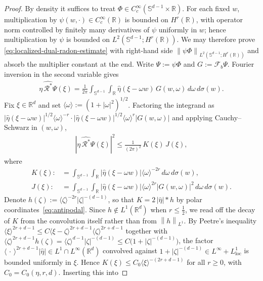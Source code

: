 \documentclass[10pt,a4paper]{amsart}
\newcommand{\R}{\mathbb{R}}
\newcommand{\Sph}{\mathbb S}
\newcommand{\norm}[1]{\left\|#1\right\|}
\begin{document}
\begin{proof}
By density it suffices to treat $\Phi\in C_c^\infty(\Sph^{d-1}\times\R)$. For each
fixed $w$, multiplication by $\psi(w,\cdot)\in C_c^\infty(\R)$ is bounded on
$H^r(\R)$, with operator norm controlled by finitely many derivatives of $\psi$
uniformly in $w$; hence multiplication by $\psi$ is bounded on
$L^2(\Sph^{d-1};H^r(\R))$. We may therefore prove
\eqref{eq:localized-dual-radon-estimate} with right-hand side
$\norm{\psi\Phi}_{L^2(\Sph^{d-1};H^r(\R))}$ and absorb the multiplier constant at
the end. Write $\Psi:=\psi\Phi$ and $G:=\mathcal F_b\Psi$. Fourier inversion in the
second variable gives
\begin{align*}
    \widehat{\eta\,\mathcal R^*\Psi}(\xi)
    =\frac1{2\pi}\int_{\Sph^{d-1}}\int_\R
    \widehat\eta(\xi-\omega w)\,G(w,\omega)\,d\omega\,d\sigma(w).
\end{align*}
Fix $\xi\in\R^d$ and set $\langle\omega\rangle:=(1+|\omega|^2)^{1/2}$. Factoring the
integrand as
$|\widehat\eta(\xi-\omega w)|^{1/2}\langle\omega\rangle^{-r}
\cdot|\widehat\eta(\xi-\omega w)|^{1/2}\langle\omega\rangle^{r}|G(w,\omega)|$
and applying Cauchy--Schwarz in $(w,\omega)$,
\begin{align}
    |\widehat{\eta\,\mathcal R^*\Psi}(\xi)|^2
    \le\frac1{(2\pi)^2}\,K(\xi)\,J(\xi),
    \label{eq:CS-split}
\end{align}
where
\begin{align*}
    K(\xi):&=\int_{\Sph^{d-1}}\int_\R|\widehat\eta(\xi-\omega w)|
\langle\omega\rangle^{-2r}\,d\omega\,d\sigma(w), \\
    J(\xi):&=\int_{\Sph^{d-1}}\int_\R|\widehat\eta(\xi-\omega w)|
\langle\omega\rangle^{2r}|G(w,\omega)|^2\,d\omega\,d\sigma(w).
\end{align*}
Denote $h(\zeta):=\langle\zeta\rangle^{-2r}|\zeta|^{-(d-1)}$, so that
$K=2\,|\widehat\eta|*h$ by polar coordinates~\eqref{eq:antipodal}. Since
$h\notin L^1(\R^d)$ when $r\le\tfrac12$, we read off the decay of $K$ from the
convolution itself rather than from $\norm{h}_{L^1}$. By Peetre's inequality
$\langle\xi\rangle^{2r+d-1}\le C\langle\xi-\zeta\rangle^{2r+d-1}
\langle\zeta\rangle^{2r+d-1}$ together with
$\langle\zeta\rangle^{2r+d-1}h(\zeta)=\langle\zeta\rangle^{d-1}|\zeta|^{-(d-1)}
\le C\bigl(1+|\zeta|^{-(d-1)}\bigr)$, the factor
$\langle\,\cdot\,\rangle^{2r+d-1}|\widehat\eta|\in L^1\cap L^\infty(\R^d)$
convolved against $1+|\zeta|^{-(d-1)}\in L^\infty+L^1_{\mathrm{loc}}$ is bounded
uniformly in $\xi$. Hence $K(\xi)\le C_0\langle\xi\rangle^{-(2r+d-1)}$ for all
$r\ge0$, with $C_0=C_0(\eta,r,d)$. Inserting this into

\end{proof}
\end{document}
